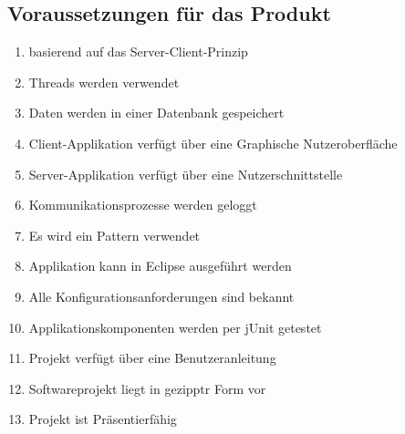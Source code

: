 \subsection{Voraussetzungen für das Produkt}
\begin{enumerate}
     \item basierend auf das Server-Client-Prinzip
     \item Threads werden verwendet
     \item Daten werden in einer Datenbank gespeichert
     \item Client-Applikation verfügt über eine Graphische Nutzeroberfläche
     \item Server-Applikation verfügt über eine Nutzerschnittstelle
     \item Kommunikationsprozesse werden geloggt
     \item Es wird ein Pattern verwendet
     \item Applikation kann in Eclipse ausgeführt werden
     \item Alle Konfigurationsanforderungen sind bekannt
     \item Applikationskomponenten werden per jUnit getestet
     \item Projekt verfügt über eine Benutzeranleitung
     \item Softwareprojekt liegt in gezipptr Form vor
     \item Projekt ist Präsentierfähig
  \end{enumerate}
